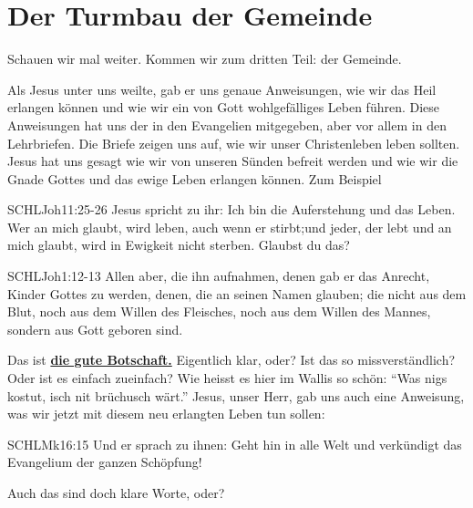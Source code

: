 \documentclass[14pt]{../../inc/mybib}
\newenvironment{block}[1][]{%
  \vspace{1.5em}%
  \noindent\textbf{#1}\par%
  \vspace{0.0em}%
}{%
  \vspace{1em}%
}
\begin{document}
    \section{Der Turmbau der Gemeinde}
    Schauen wir mal weiter. Kommen wir zum dritten Teil:  der Gemeinde.
    \begin{block}
    Als Jesus unter uns weilte, gab er uns genaue Anweisungen, wie wir das Heil erlangen können und wie wir ein von Gott wohlgefälliges Leben führen. Diese Anweisungen hat uns der \herr{} in den Evangelien mitgegeben, aber vor allem in den Lehrbriefen. Die Briefe zeigen uns auf, wie wir unser Christenleben leben sollten.
    Jesus hat uns gesagt wie wir von unseren Sünden befreit werden und wie wir die Gnade Gottes und das ewige Leben erlangen können. Zum Beispiel
    \begin{bibelbox}{SCHL}{Joh}{11:25-26}
        Jesus spricht zu ihr: Ich bin die Auferstehung und das Leben. Wer an mich glaubt, wird leben, auch wenn er stirbt;und jeder, der lebt und an mich glaubt, wird in Ewigkeit nicht sterben. Glaubst du das?
    \end{bibelbox} 
    \begin{bibelbox}{SCHL}{Joh}{1:12-13}
        Allen aber, die ihn aufnahmen, denen gab er das Anrecht, Kinder Gottes zu werden, denen, die an seinen Namen glauben;
        die nicht aus dem Blut, noch aus dem Willen des Fleisches, noch aus dem Willen des Mannes, sondern aus Gott geboren sind.
    \end{bibelbox} 
    Das ist \textbf{\underline{die gute Botschaft.}}
    Eigentlich klar, oder? Ist das so missverständlich? Oder ist es einfach zueinfach? Wie heisst es hier im Wallis so schön: \enquote{Was nigs kostut, isch nit brüchusch wärt.} Jesus, unser Herr, gab uns auch eine Anweisung, was wir jetzt mit diesem neu erlangten Leben tun sollen:
    \begin{bibelbox}{SCHL}{Mk}{16:15}
        Und er sprach zu ihnen: Geht hin in alle Welt und verkündigt das Evangelium der ganzen Schöpfung!
    \end{bibelbox} 
    Auch das sind doch klare Worte, oder?
\end{block}
\end{document}

